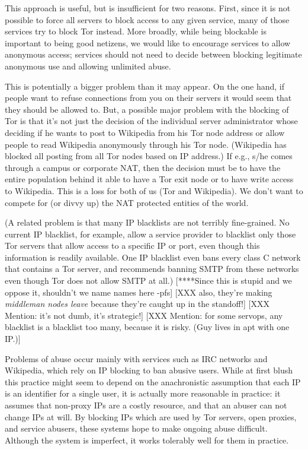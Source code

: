 \documentclass{llncs}
\begin{document}
This approach is useful, but is insufficient for two reasons.  First, since
it is not possible to force all servers to block access to any given service,
many of those services try to block Tor instead.  More broadly, while being
blockable is important to being good netizens, we would like to encourage
services to allow anonymous access; services should not need to decide
between blocking legitimate anonymous use and allowing unlimited abuse.

This is potentially a bigger problem than it may appear. 
On the one hand, if people want to refuse connections from you on
their servers it would seem that they should be allowed to.  But, a
possible major problem with the blocking of Tor is that it's not just
the decision of the individual server administrator whose deciding if
he wants to post to Wikipedia from his Tor node address or allow
people to read Wikipedia anonymously through his Tor node. (Wikipedia
has blocked all posting from all Tor nodes based on IP address.) If e.g.,
s/he comes through a campus or corporate NAT, then the decision must
be to have the entire population behind it able to have a Tor exit
node or to have write access to Wikipedia. This is a loss for both of us (Tor
and Wikipedia). We don't want to compete for (or divvy up) the NAT
protected entities of the world.

(A related problem is that many IP blacklists are not terribly fine-grained.
No current IP blacklist, for example, allow a service provider to blacklist
only those Tor servers that allow access to a specific IP or port, even
though this information is readily available.  One IP blacklist even bans
every class C network that contains a Tor server, and recommends banning SMTP
from these networks even though Tor does not allow SMTP at all.)
[****Since this is stupid and we oppose it, shouldn't we name names here -pfs]
[XXX also, they're making \emph{middleman nodes leave} because they're caught
 up in the standoff!]
[XXX Mention: it's not dumb, it's strategic!]
[XXX Mention: for some servops, any blacklist is a blacklist too many,
  because it is risky.  (Guy lives in apt with one IP.)]

Problems of abuse occur mainly with services such as IRC networks and
Wikipedia, which rely on IP blocking to ban abusive users.  While at first
blush this practice might seem to depend on the anachronistic assumption that
each IP is an identifier for a single user, it is actually more reasonable in
practice: it assumes that non-proxy IPs are a costly resource, and that an
abuser can not change IPs at will.  By blocking IPs which are used by Tor
servers, open proxies, and service abusers, these systems hope to make
ongoing abuse difficult.  Although the system is imperfect, it works
tolerably well for them in practice.
\end{document}
